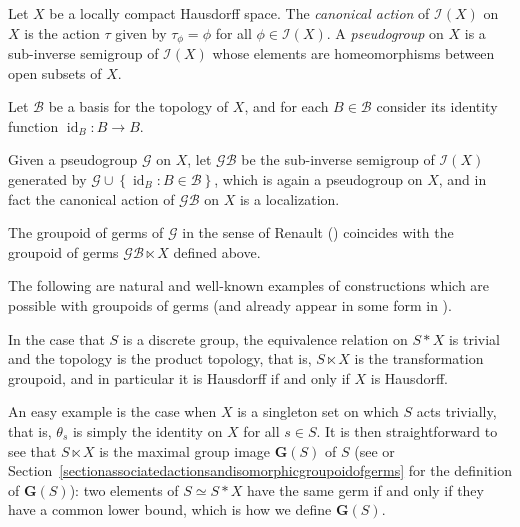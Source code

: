 \begin{example}
Let $X$ be a locally compact Hausdorff space. The \emph{canonical action} of $\mathcal{I}(X)$ on $X$ is the action $\tau$ given by $\tau_\phi=\phi$ for all $\phi\in\mathcal{I}(X)$. A \emph{pseudogroup} on $X$ is a sub-inverse semigroup of $\mathcal{I}(X)$ whose elements are homeomorphisms between open subsets of $X$.

Let $\mathcal{B}$ be a basis for the topology of $X$, and for each $B\in\mathcal{B}$ consider its identity function $\operatorname{id}_B:B\to B$.

Given a pseudogroup $\mathcal{G}$ on $X$, let $\mathcal{G}\mathcal{B}$ be the sub-inverse semigroup of $\mathcal{I}(X)$ generated by $\mathcal{G}\cup\left\{\operatorname{id}_B:B\in\mathcal{B}\right\}$, which is again a pseudogroup on $X$, and in fact the canonical action of $\mathcal{G}\mathcal{B}$ on $X$ is a localization.

The groupoid of germs of $\mathcal{G}$ in the sense of Renault (\cite{MR2460017})  coincides with the groupoid of germs $\mathcal{G}\mathcal{B}\ltimes X$ defined above.
\end{example}

The following are natural and well-known examples of constructions which are possible with groupoids of germs (and already appear in some form in \cite{MR2565546}).

\begin{example}
In the case that $S$ is a discrete group, the equivalence relation on $S \ast X$ is trivial and the topology is the product topology, that is, $S\ltimes X$ is the transformation groupoid, and in particular it is Hausdorff if and only if $X$ is Hausdorff.%
\end{example}

\begin{example}
An easy example is the case when $X$ is a singleton set on which $S$ acts trivially, that is, $\theta_s$ is simply the identity on $X$ for all $s\in S$. It is then straightforward to see that $S \ltimes X$ is the maximal group image $\mathbf{G}(S)$ of $S$ (see \cite{MR1724106} or Section~\ref{sectionassociatedactionsandisomorphicgroupoidofgerms} for the definition of $\mathbf{G}(S)$): two elements of $S\simeq S\ast X$ have the same germ if and only if they have a common lower bound, which is how we define $\mathbf{G}(S)$.
\end{example}

